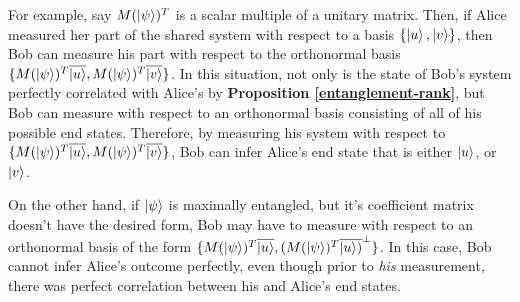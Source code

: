For example, say $M(\ket{\psi})^T$ is a scalar multiple of a unitary matrix.  Then, if Alice measured her part of the shared system with respect to a basis $\{\ket{u}, \ket{v}\}$, then 
Bob can measure his part with respect to the orthonormal basis $\{M(\ket{\psi})^T\overline{\ket{u}}, M(\ket{\psi})^T\overline{\ket{v}}\}$. In this situation, not only is the state of Bob's system perfectly correlated with Alice's by \textbf{Proposition \ref{entanglement-rank}}, but Bob can measure with respect to an orthonormal basis consisting of all of his possible end states.  Therefore, by measuring his system with respect to $\{M(\ket{\psi})^T\overline{\ket{u}}, M(\ket{\psi})^T\overline{\ket{v}}\}$, Bob can infer Alice's end state that is either $\ket{u}$, or $\ket{v}$.

On the other hand, if $\ket{\psi}$ is maximally entangled, but it's coefficient matrix doesn't have the desired form, Bob may have to measure with respect to an orthonormal basis of the form $\{M(\ket{\psi})^T\overline{\ket{u}}, (M(\ket{\psi})^T\overline{\ket{u})}^\perp \}$.  In this case, Bob cannot infer Alice's outcome perfectly, even though prior to {\emph{his}} measurement, there was perfect correlation between his and Alice's end states.  

